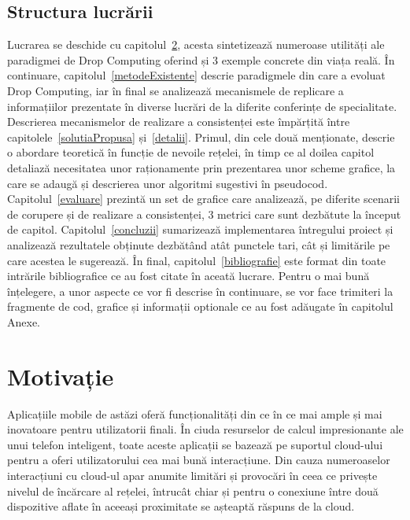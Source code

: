 \documentclass[12pt,a4paper]{report}
\begin{document}
\section{Structura lucrării}
Lucrarea se deschide cu capitolul~\ref{motivatie}, acesta sintetizează numeroase utilități ale paradigmei de Drop Computing oferind și 3 exemple concrete din viața reală. În continuare, capitolul~\ref{metodeExistente} descrie paradigmele din care a evoluat Drop Computing, iar în final se analizează mecanismele de replicare a informațiilor prezentate în diverse lucrări de la diferite conferințe de specialitate. Descrierea mecanismelor de realizare a consistenței este împărțită între capitolele~\ref{solutiaPropusa} și~\ref{detalii}. Primul, din cele două menționate, descrie o abordare teoretică în funcție de nevoile rețelei, în timp ce al doilea capitol detaliază necesitatea unor raționamente prin prezentarea unor scheme grafice, la care se adaugă și descrierea unor algoritmi sugestivi în pseudocod. Capitolul~\ref{evaluare} prezintă un set de grafice care analizează, pe diferite scenarii de corupere și de realizare a consistenței, 3 metrici care sunt dezbătute la început de capitol.
Capitolul~\ref{concluzii} sumarizează implementarea întregului proiect și analizează rezultatele obținute dezbătând atât punctele tari, cât și limitările pe care acestea le sugerează. În final, capitolul~\ref{bibliografie} este format din toate intrările bibliografice ce au fost citate în aceată lucrare. Pentru o mai bună înțelegere, a unor aspecte ce vor fi descrise în continuare, se vor face trimiteri la fragmente de cod, grafice și informații optionale ce au fost adăugate în capitolul Anexe. 


\chapter{Motivație} \label{motivatie}

Aplicațiile mobile de astăzi oferă funcționalități din ce în ce mai ample și mai inovatoare pentru utilizatorii finali. În ciuda resurselor de calcul impresionante ale unui telefon inteligent, toate aceste aplicații se bazează pe suportul cloud-ului pentru a oferi utilizatorului cea mai bună interacțiune. Din cauza numeroaselor interacțiuni cu cloud-ul apar anumite limitări și provocări în ceea ce privește nivelul de încărcare al rețelei, întrucât chiar și pentru o conexiune între două dispozitive aflate în aceeași proximitate se așteaptă răspuns de la cloud.
\end{document}
